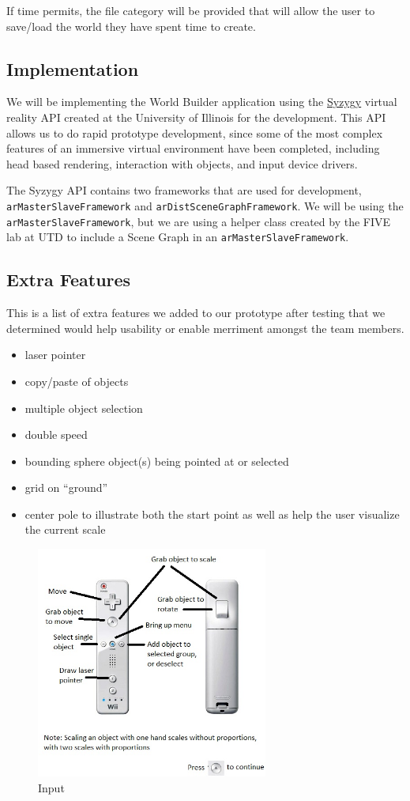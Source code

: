 If time permits, the file category will be provided that will allow the user to save/load the world they have spent time to create.

\subsection{Implementation}
We will be implementing the World Builder application using the \href{http://syzygy.isl.uiuc.edu/szg/szgsrc/doc/index.html}{Syzygy} virtual reality API created at the University of Illinois for the development.
This API allows us to do rapid prototype development, since some of the most complex features of an immersive virtual environment have been completed, including head based rendering, interaction with objects, and input device drivers.

The Syzygy API contains two frameworks that are used for development, \verb|arMasterSlaveFramework| and \verb|arDistSceneGraphFramework|.
We will be using the \verb|arMasterSlaveFramework|, but we are using a helper class created by the FIVE lab at UTD to include a Scene Graph in an \verb|arMasterSlaveFramework|.

\subsection{Extra Features}
This is a list of extra features we added to our prototype after testing that we determined would help usability or enable merriment amongst the team members.

\begin{itemize}
    \item laser pointer
    \item copy/paste of objects
    \item multiple object selection
    \item double speed
    \item bounding sphere object(s) being pointed at or selected
    \item grid on ``ground''
    \item center pole to illustrate both the start point as well as help the user visualize the current scale
\end{itemize}

\begin{figure}[htbp]
	\centering
	\includegraphics[width=3in]{figs/help.jpg}
	\caption{Input}
	\label{fig:help}
\end{figure}
